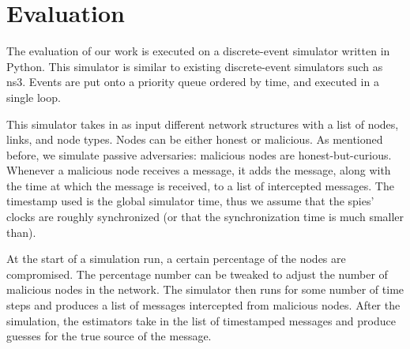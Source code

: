 \section{Evaluation}
\label{sec:eval}

The evaluation of our work is executed on a discrete-event simulator written in Python. This simulator is similar to existing discrete-event simulators such as ns3. Events are put onto a priority queue ordered by time, and executed in a single loop.

This simulator takes in as input different network structures with a list of nodes, links, and node types. 
Nodes can be either honest or malicious. As mentioned before, we simulate passive adversaries: malicious nodes are honest-but-curious. Whenever a malicious node receives a message, it adds the message, along with the time at which the message is received, to a list of intercepted messages. The timestamp used is the global simulator time, thus we assume that the spies' clocks are roughly synchronized (or that the synchronization time is much smaller than). 

At the start of a simulation run, a certain percentage of the nodes are compromised. The percentage number can be tweaked to adjust the number of malicious nodes in the network. The simulator then runs for some number of time steps and produces a list of messages intercepted from malicious nodes. After the simulation, the estimators take in the list of timestamped messages and produce guesses for the true source of the message.

